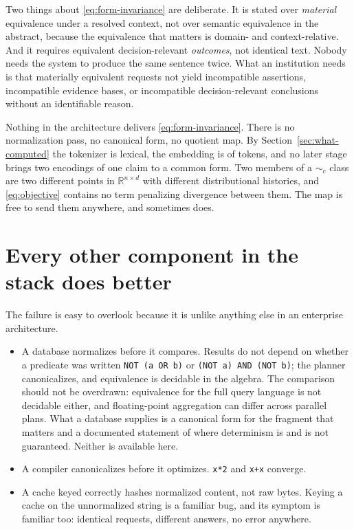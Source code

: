 Two things about \eqref{eq:form-invariance} are deliberate. It is stated over
\emph{material} equivalence under a resolved context, not over semantic
equivalence in the abstract, because the equivalence that matters is domain- and
context-relative. And it requires equivalent decision-relevant \emph{outcomes},
not identical text. Nobody needs the system to produce the same sentence twice.
What an institution needs is that materially equivalent requests not yield
incompatible assertions, incompatible evidence bases, or incompatible
decision-relevant conclusions without an identifiable reason.

Nothing in the architecture delivers \eqref{eq:form-invariance}. There is no
normalization pass, no canonical form, no quotient map. By
Section~\ref{sec:what-computed} the tokenizer is lexical, the embedding is of
tokens, and no later stage brings two encodings of one claim to a common form. Two
members of a $\sim_c$ class are two different points in $\mathbb{R}^{n \times d}$
with different distributional histories, and \eqref{eq:objective} contains no term
penalizing divergence between them. The map is free to send them anywhere, and
sometimes does.

\section{Every other component in the stack does better}

The failure is easy to overlook because it is unlike anything else in an enterprise
architecture.

\begin{itemize}
  \item A database normalizes before it compares. Results do not depend on whether
        a predicate was written \texttt{NOT (a OR b)} or \texttt{(NOT a) AND (NOT
        b)}; the planner canonicalizes, and equivalence is decidable in the
        algebra. The comparison should not be overdrawn: equivalence for the full
        query language is not decidable either, and floating-point aggregation can
        differ across parallel plans. What a database supplies is a canonical form
        for the fragment that matters and a documented statement of where determinism
        is and is not guaranteed. Neither is available here.
  \item A compiler canonicalizes before it optimizes. \texttt{x*2} and
        \texttt{x+x} converge.
  \item A cache keyed correctly hashes normalized content, not raw bytes. Keying a
        cache on the unnormalized string is a familiar bug, and its symptom is
        familiar too: identical requests, different answers, no error anywhere.
\end{itemize}

